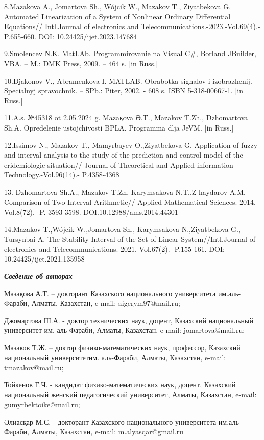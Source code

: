 8.Mazakova A., Jomartova Sh., Wójcik W., Mazakov T., Ziyatbekova G.
Automated Linearization of a System of Nonlinear Ordinary Differential
Equations// Intl.Journal of electronics and
Telecommunications.-2023.-Vol.69(4).- P.655-660. DOI:
10.24425/ijet.2023.147684

9.Smolencev N.K. MatLAb. Programmirovanie na Visual C\#, Borland
JBuilder, VBA. -- M.: DMK Press, 2009. -- 464 s. {[}in Russ.{]}

10.D\textquotesingle jakonov V., Abramenkova I. MATLAB. Obrabotka
signalov i izobrazhenij. Special\textquotesingle nyj spravochnik. --
SPb.: Piter, 2002. - 608 s. ISBN 5-318-00667-1. {[}in Russ.{]}

11.A.s. №45318 ot 2.05.2024 g. Mazaқova Ә.T., Mazakov T.Zh., Dzhomartova
Sh.A. Opredelenie ustojchivosti BPLA. Programma dlja JeVM. {[}in
Russ.{]}

12.Issimov N., Mazakov T., Mamyrbayev O.,Ziyatbekova G. Application of
fuzzy and interval analysis to the study of the prediction and control
model of the eridemiologic situation// Journal of Theoretical and
Applied information Technology.-Vol.96(14).- P.4358-4368

13. Dzhomartova Sh.A., Mazakov T.Zh, Karymsakova N.T.,Z haydarov A.M.
Comparison of Two Interval Arithmetic// Applied Mathematical
Sciences.-2014.-Vol.8(72).- P.-3593-3598. DOI.10.12988/ams.2014.44301

14.Mazakov T.,Wójcik W.,Jomartova Sh., Karymsakova N.,Ziyatbekova G.,
Tursynbai A. The Stability Interval of the Set of Linear
System//Intl.Journal of electronics and
Telecommunications.-2021.-Vol.67(2).- P.155-161. DOI:
10.24425/ijet.2021.135958

\emph{{\bfseries Сведение об авторах}}

Мазақова А.Т. -- докторант Казахского национального университета
им.аль-Фараби, Алматы, Казахстан, e-mail: aigerym97@mail.ru;

Джомартова Ш.А. - доктор технических наук, доцент, Казахский
национальный университет им. аль-Фараби, Алматы, Казахстан, e-mail:
jomartova@mail.ru;

Мазаков Т.Ж. -- доктор физико-математических наук, профессор, Казахский
национальный университетим. аль-Фараби, Алматы, Казахстан, e-mail:
tmazakov@mail.ru;

Тойкенов Г.Ч. - кандидат физико-математических наук, доцент, Казахский
национальный женский педагогический университет, Алматы, Казахстан,
e-mail: gumyrbektoike@mail.ru;

Әлиасқар М.С. - докторант Казахского национального университета
им.аль-Фараби, Алматы, Казахстан, e-mail: m.alyasqar@gmail.ru

